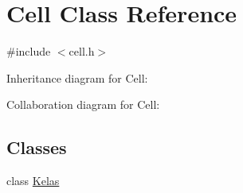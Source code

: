 \hypertarget{classCell}{}\section{Cell Class Reference}
\label{classCell}


{\ttfamily \#include $<$cell.\+h$>$}



Inheritance diagram for Cell\+:


Collaboration diagram for Cell\+:
\subsection*{Classes}
\begin{DoxyCompactItemize}
\item 
class \hyperlink{classCell_1_1Kelas}{Kelas}
\end{DoxyCompactItemize}
